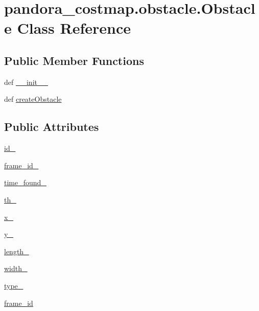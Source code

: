 \hypertarget{classpandora__costmap_1_1obstacle_1_1_obstacle}{\section{pandora\-\_\-costmap.\-obstacle.\-Obstacle \-Class \-Reference}
\label{classpandora__costmap_1_1obstacle_1_1_obstacle}
}
\subsection*{\-Public \-Member \-Functions}
\begin{DoxyCompactItemize}
\item 
def \hyperlink{classpandora__costmap_1_1obstacle_1_1_obstacle_ab7bc6c98c14365ee5ca62e59efa6b943}{\-\_\-\-\_\-init\-\_\-\-\_\-}
\item 
def \hyperlink{classpandora__costmap_1_1obstacle_1_1_obstacle_aff0051de10fadf440c2d460ec5408f0b}{create\-Obstacle}
\end{DoxyCompactItemize}
\subsection*{\-Public \-Attributes}
\begin{DoxyCompactItemize}
\item 
\hyperlink{classpandora__costmap_1_1obstacle_1_1_obstacle_a06eff299827b7ad43724136673c18083}{id\-\_\-}
\item 
\hyperlink{classpandora__costmap_1_1obstacle_1_1_obstacle_ad172403a96232cb0e5d43bf3e216ba6b}{frame\-\_\-id\-\_\-}
\item 
\hyperlink{classpandora__costmap_1_1obstacle_1_1_obstacle_a18248993757e213bf44a2f2d073972ff}{time\-\_\-found\-\_\-}
\item 
\hyperlink{classpandora__costmap_1_1obstacle_1_1_obstacle_a6fa18e8d6bf7ad2fd0d38be91cae49f7}{th\-\_\-}
\item 
\hyperlink{classpandora__costmap_1_1obstacle_1_1_obstacle_a2e0697806f0a09468511c5c37409f1e3}{x\-\_\-}
\item 
\hyperlink{classpandora__costmap_1_1obstacle_1_1_obstacle_a57f0181a20c8638ffa17b1090d8c6db8}{y\-\_\-}
\item 
\hyperlink{classpandora__costmap_1_1obstacle_1_1_obstacle_a67d3e621058265646aec9ad05e06db96}{length\-\_\-}
\item 
\hyperlink{classpandora__costmap_1_1obstacle_1_1_obstacle_a2baf5a287213412d23bf083f2f718a73}{width\-\_\-}
\item 
\hyperlink{classpandora__costmap_1_1obstacle_1_1_obstacle_ab6452d54880c50fb6738e28542c01201}{type\-\_\-}
\item 
\hyperlink{classpandora__costmap_1_1obstacle_1_1_obstacle_aa677d82fd3ef5a0bb65c4fdf29d3a26e}{frame\-\_\-id}
\end{DoxyCompactItemize}


